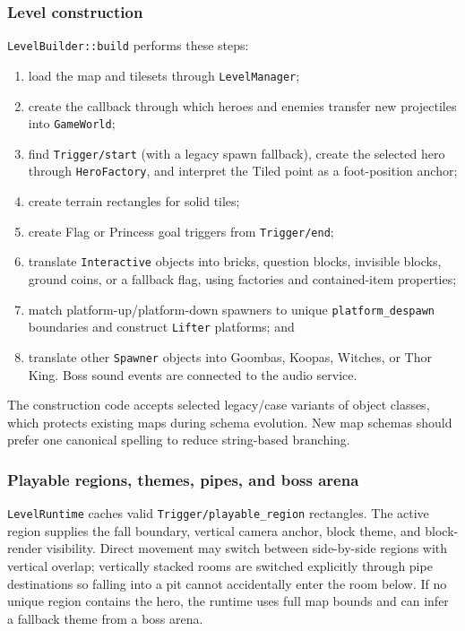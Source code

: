 \subsubsection{Level construction}

\texttt{LevelBuilder::build} performs these steps:

\begin{enumerate}
    \item load the map and tilesets through \texttt{LevelManager};
    \item create the callback through which heroes and enemies transfer new
    projectiles into \texttt{GameWorld};
    \item find \texttt{Trigger/start} (with a legacy spawn fallback), create the
    selected hero through \texttt{HeroFactory}, and interpret the Tiled point as
    a foot-position anchor;
    \item create terrain rectangles for solid tiles;
    \item create Flag or Princess goal triggers from \texttt{Trigger/end};
    \item translate \texttt{Interactive} objects into bricks, question blocks,
    invisible blocks, ground coins, or a fallback flag, using factories and
    contained-item properties;
    \item match platform-up/platform-down spawners to unique
    \texttt{platform\_despawn} boundaries and construct \texttt{Lifter}
    platforms; and
    \item translate other \texttt{Spawner} objects into Goombas, Koopas,
    Witches, or Thor King.  Boss sound events are connected to the audio service.
\end{enumerate}

The construction code accepts selected legacy/case variants of object classes,
which protects existing maps during schema evolution.  New map schemas should
prefer one canonical spelling to reduce string-based branching.

\subsubsection{Playable regions, themes, pipes, and boss arena}

\texttt{LevelRuntime} caches valid \texttt{Trigger/playable\_region} rectangles.
The active region supplies the fall boundary, vertical camera anchor, block
theme, and block-render visibility.  Direct movement may switch between
side-by-side regions with vertical overlap; vertically stacked rooms are
switched explicitly through pipe destinations so falling into a pit cannot
accidentally enter the room below.  If no unique region contains the hero, the
runtime uses full map bounds and can infer a fallback theme from a boss arena.

